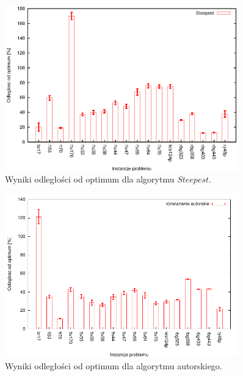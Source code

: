 \begin{figure}
\begin{center}
\includegraphics[width=0.9\textwidth]{wykresy/steepest1}
\end{center}
\caption{Wyniki odległości od optimum dla algorytmu $Steepest$.}
\label{steepest1}
\end{figure}

\begin{figure}
\begin{center}
\includegraphics[width=0.9\textwidth]{wykresy/greedy2_1}
\end{center}
\caption{Wyniki odległości od optimum dla algorytmu autorskiego.}
\label{greedy2_1}
\end{figure}


